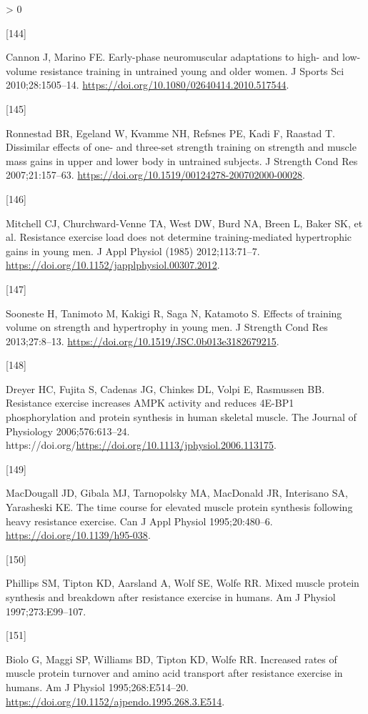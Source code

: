 \documentclass[twoside,10pt]{gihclass} %
\newlength{\cslhangindent}
\newlength{\csllabelwidth}
\newenvironment{CSLReferences}[3] %
 {%
  \setlength{\parindent}{0pt}
  \ifodd #1 \everypar{\setlength{\hangindent}{\cslhangindent}}\ignorespaces\fi
  \ifnum #2 > 0
  \setlength{\parskip}{#2\baselineskip}
  \fi
 }%
 {}
\newcommand{\CSLLeftMargin}[1]{\parbox[t]{\maxof{\widthof{#1}}{\csllabelwidth}}{#1}}
\newcommand{\CSLRightInline}[1]{\parbox[t]{\linewidth}{#1}}
\begin{document}
\begin{CSLReferences}{0}{0}
\leavevmode\hypertarget{ref-RN1382}{}%
\CSLLeftMargin{{[}144{]} }
\CSLRightInline{Cannon J, Marino FE. Early-phase neuromuscular adaptations to high- and low-volume resistance training in untrained young and older women. J Sports Sci 2010;28:1505--14. \url{https://doi.org/10.1080/02640414.2010.517544}.}

\leavevmode\hypertarget{ref-RN776}{}%
\CSLLeftMargin{{[}145{]} }
\CSLRightInline{Ronnestad BR, Egeland W, Kvamme NH, Refsnes PE, Kadi F, Raastad T. Dissimilar effects of one- and three-set strength training on strength and muscle mass gains in upper and lower body in untrained subjects. J Strength Cond Res 2007;21:157--63. \url{https://doi.org/10.1519/00124278-200702000-00028}.}

\leavevmode\hypertarget{ref-RN834}{}%
\CSLLeftMargin{{[}146{]} }
\CSLRightInline{Mitchell CJ, Churchward-Venne TA, West DW, Burd NA, Breen L, Baker SK, et al. Resistance exercise load does not determine training-mediated hypertrophic gains in young men. J Appl Physiol (1985) 2012;113:71--7. \url{https://doi.org/10.1152/japplphysiol.00307.2012}.}

\leavevmode\hypertarget{ref-RN1607}{}%
\CSLLeftMargin{{[}147{]} }
\CSLRightInline{Sooneste H, Tanimoto M, Kakigi R, Saga N, Katamoto S. Effects of training volume on strength and hypertrophy in young men. J Strength Cond Res 2013;27:8--13. \url{https://doi.org/10.1519/JSC.0b013e3182679215}.}

\leavevmode\hypertarget{ref-RN2710}{}%
\CSLLeftMargin{{[}148{]} }
\CSLRightInline{Dreyer HC, Fujita S, Cadenas JG, Chinkes DL, Volpi E, Rasmussen BB. Resistance exercise increases AMPK activity and reduces 4E-BP1 phosphorylation and protein synthesis in human skeletal muscle. The Journal of Physiology 2006;576:613--24. https://doi.org/\url{https://doi.org/10.1113/jphysiol.2006.113175}.}

\leavevmode\hypertarget{ref-RN2711}{}%
\CSLLeftMargin{{[}149{]} }
\CSLRightInline{MacDougall JD, Gibala MJ, Tarnopolsky MA, MacDonald JR, Interisano SA, Yarasheski KE. The time course for elevated muscle protein synthesis following heavy resistance exercise. Can J Appl Physiol 1995;20:480--6. \url{https://doi.org/10.1139/h95-038}.}

\leavevmode\hypertarget{ref-RN786}{}%
\CSLLeftMargin{{[}150{]} }
\CSLRightInline{Phillips SM, Tipton KD, Aarsland A, Wolf SE, Wolfe RR. Mixed muscle protein synthesis and breakdown after resistance exercise in humans. Am J Physiol 1997;273:E99--107.}

\leavevmode\hypertarget{ref-RN2712}{}%
\CSLLeftMargin{{[}151{]} }
\CSLRightInline{Biolo G, Maggi SP, Williams BD, Tipton KD, Wolfe RR. Increased rates of muscle protein turnover and amino acid transport after resistance exercise in humans. Am J Physiol 1995;268:E514--20. \url{https://doi.org/10.1152/ajpendo.1995.268.3.E514}.}


\end{CSLReferences}
\end{document}

